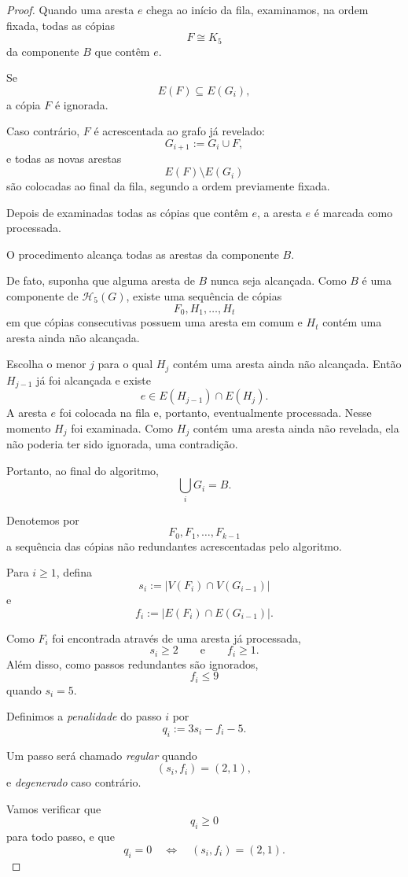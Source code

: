 \documentclass[reqno, 12pt]{amsart}
\numberwithin{equation}{section}
\theoremstyle{plain}
\theoremstyle{definition}
\begin{document}
\begin{proof}
  Quando uma aresta $e$ chega ao início da fila, examinamos, na ordem
  fixada, todas as cópias
  \[
    F\cong K_5
  \]
  da componente $B$ que contêm $e$.

  Se
  \[
    E(F)\subseteq E(G_i),
  \]
  a cópia $F$ é ignorada.

  Caso contrário, $F$ é acrescentada ao grafo já revelado:
  \[
    G_{i+1}:=G_i\cup F,
  \]
  e todas as novas arestas
  \[
    E(F)\setminus E(G_i)
  \]
  são colocadas ao final da fila, segundo a ordem previamente fixada.

  Depois de examinadas todas as cópias que contêm $e$, a aresta $e$ é
  marcada como processada.

  O procedimento alcança todas as arestas da componente $B$.

  De fato, suponha que alguma aresta de $B$ nunca seja alcançada.
  Como $B$ é uma componente de $\mathcal H_5(G)$, existe uma sequência
  de cópias
  \[
    F_0,H_1,\ldots,H_t
  \]
  em que cópias consecutivas possuem uma aresta em comum e $H_t$
  contém uma aresta ainda não alcançada.

  Escolha o menor $j$ para o qual $H_j$ contém uma aresta ainda não
  alcançada. Então $H_{j-1}$ já foi alcançada e existe
  \[
    e\in E(H_{j-1})\cap E(H_j).
  \]
  A aresta $e$ foi colocada na fila e, portanto, eventualmente
  processada. Nesse momento $H_j$ foi examinada. Como $H_j$ contém
  uma aresta ainda não revelada, ela não poderia ter sido ignorada,
  uma contradição.

  Portanto, ao final do algoritmo,
  \[
    \bigcup_i G_i=B.
  \]

  Denotemos por
  \[
    F_0,F_1,\ldots,F_{k-1}
  \]
  a sequência das cópias não redundantes acrescentadas pelo algoritmo.

  Para $i\ge1$, defina
  \[
    s_i:=|V(F_i)\cap V(G_{i-1})|
  \]
  e
  \[
    f_i:=|E(F_i)\cap E(G_{i-1})|.
  \]

  Como $F_i$ foi encontrada através de uma aresta já processada,
  \[
    s_i\ge2
    \qquad\text{e}\qquad
    f_i\ge1.
  \]
  Além disso, como passos redundantes são ignorados,
  \[
    f_i\le9
  \]
  quando $s_i=5$.

  Definimos a \emph{penalidade} do passo $i$ por
  \[
    q_i:=3s_i-f_i-5.
  \]

  Um passo será chamado \emph{regular} quando
  \[
    (s_i,f_i)=(2,1),
  \]
  e \emph{degenerado} caso contrário.

  Vamos verificar que
  \[
    q_i\ge0
  \]
  para todo passo, e que
  \[
    q_i=0
    \quad\Longleftrightarrow\quad
    (s_i,f_i)=(2,1).
  \]


\end{proof}
\end{document}
